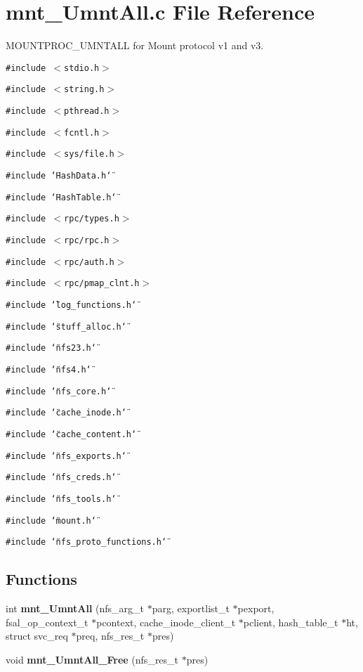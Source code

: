 \section{mnt\_\-Umnt\-All.c File Reference}
\label{mnt__UmntAll_8c}
MOUNTPROC\_\-UMNTALL for Mount protocol v1 and v3. 

{\tt \#include $<$stdio.h$>$}\par
{\tt \#include $<$string.h$>$}\par
{\tt \#include $<$pthread.h$>$}\par
{\tt \#include $<$fcntl.h$>$}\par
{\tt \#include $<$sys/file.h$>$}\par
{\tt \#include \char`\"{}Hash\-Data.h\char`\"{}}\par
{\tt \#include \char`\"{}Hash\-Table.h\char`\"{}}\par
{\tt \#include $<$rpc/types.h$>$}\par
{\tt \#include $<$rpc/rpc.h$>$}\par
{\tt \#include $<$rpc/auth.h$>$}\par
{\tt \#include $<$rpc/pmap\_\-clnt.h$>$}\par
{\tt \#include \char`\"{}log\_\-functions.h\char`\"{}}\par
{\tt \#include \char`\"{}stuff\_\-alloc.h\char`\"{}}\par
{\tt \#include \char`\"{}nfs23.h\char`\"{}}\par
{\tt \#include \char`\"{}nfs4.h\char`\"{}}\par
{\tt \#include \char`\"{}nfs\_\-core.h\char`\"{}}\par
{\tt \#include \char`\"{}cache\_\-inode.h\char`\"{}}\par
{\tt \#include \char`\"{}cache\_\-content.h\char`\"{}}\par
{\tt \#include \char`\"{}nfs\_\-exports.h\char`\"{}}\par
{\tt \#include \char`\"{}nfs\_\-creds.h\char`\"{}}\par
{\tt \#include \char`\"{}nfs\_\-tools.h\char`\"{}}\par
{\tt \#include \char`\"{}mount.h\char`\"{}}\par
{\tt \#include \char`\"{}nfs\_\-proto\_\-functions.h\char`\"{}}\par
\subsection*{Functions}
\begin{CompactItemize}
\item 
int {\bf mnt\_\-Umnt\-All} (nfs\_\-arg\_\-t $\ast$parg, exportlist\_\-t $\ast$pexport, fsal\_\-op\_\-context\_\-t $\ast$pcontext, cache\_\-inode\_\-client\_\-t $\ast$pclient, hash\_\-table\_\-t $\ast$ht, struct svc\_\-req $\ast$preq, nfs\_\-res\_\-t $\ast$pres)
\item 
void {\bf mnt\_\-Umnt\-All\_\-Free} (nfs\_\-res\_\-t $\ast$pres)
\end{CompactItemize}


